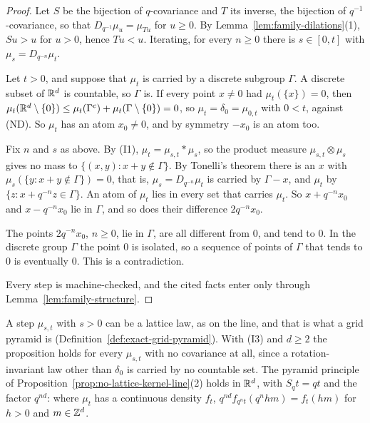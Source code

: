 \begin{proof}
\leanok
{}
Let $S$ be the bijection of $q$-covariance and $T$ its inverse, the bijection of
$q^{-1}$-covariance, so that $D_{q^{-1}}\mu_u = \mu_{Tu}$ for $u \ge 0$. By
Lemma~\ref{lem:family-dilations}(1), $Su > u$ for $u > 0$, hence $Tu < u$. Iterating, for every
$n \ge 0$ there is $s \in [0, t]$ with $\mu_s = D_{q^{-n}}\mu_t$.

Let $t > 0$, and suppose that $\mu_t$ is carried by a discrete subgroup $\Gamma$. A discrete subset
of $\mathbb{R}^d$ is countable, so $\Gamma$ is. If every point $x \ne 0$ had $\mu_t(\{x\}) = 0$, then
$\mu_t(\mathbb{R}^d \setminus \{0\}) \le \mu_t(\Gamma^c) + \mu_t(\Gamma \setminus \{0\}) = 0$, so
$\mu_t = \delta_0 = \mu_{0,t}$ with $0 < t$, against (ND). So $\mu_t$ has an atom $x_0 \ne 0$, and
by symmetry $-x_0$ is an atom too.

Fix $n$ and $s$ as above. By (I1), $\mu_t = \mu_{s,t} * \mu_s$, so the product measure
$\mu_{s,t} \otimes \mu_s$ gives no mass to $\{(x, y) : x + y \notin \Gamma\}$. By Tonelli's theorem
there is an $x$ with $\mu_s(\{y : x + y \notin \Gamma\}) = 0$, that is, $\mu_s = D_{q^{-n}}\mu_t$ is
carried by $\Gamma - x$, and $\mu_t$ by $\{z : x + q^{-n}z \in \Gamma\}$. An atom of $\mu_t$ lies in
every set that carries $\mu_t$. So $x + q^{-n}x_0$ and $x - q^{-n}x_0$ lie in $\Gamma$, and so does
their difference $2q^{-n}x_0$.

The points $2q^{-n}x_0$, $n \ge 0$, lie in $\Gamma$, are all different from $0$, and tend to $0$.
In the discrete group $\Gamma$ the point $0$ is isolated, so a sequence of points of $\Gamma$ that
tends to $0$ is eventually $0$. This is a contradiction.

Every step is machine-checked, and the cited facts enter only through
Lemma~\ref{lem:family-structure}.
\end{proof}

A step $\mu_{s,t}$ with $s > 0$ can be a lattice law, as on the line, and that is what a grid
pyramid is (Definition~\ref{def:exact-grid-pyramid}). With (I3) and $d \ge 2$ the proposition holds
for every $\mu_{s,t}$ with no covariance at all, since a rotation-invariant law other than $\delta_0$
is carried by no countable set. The pyramid principle of
Proposition~\ref{prop:no-lattice-kernel-line}(2) holds in $\mathbb{R}^d$, with $S_qt = qt$ and the factor
$q^{nd}$: where $\mu_t$ has a continuous density $f_t$, $q^{nd}f_{q^nt}(q^nhm) = f_t(hm)$ for
$h > 0$ and $m \in \mathbb{Z}^d$.

